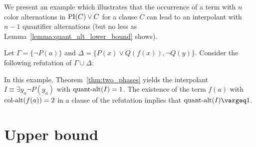 \documentclass[%
	draft=false,%
	numbers=noendperiod,%
	11pt,%
	a4paper,%
	oneside,%
	openany,%
]{memoir}
\begin{document}
\begin{comment}
\begin{lemma}
	\label{lemma:quant_alt_lower_bound_old}
	If a term with $n$ color alternations occurs in $\PI^*(C) \lor C$ for a clause $C$, then the interpolant $I$ produced in Theorem~\ref{thm:two_phases} contains at least $n-1$ quantifier alternations.
\end{lemma}
\begin{proof}
	By Lemma~\ref{lemma:subterm_in_gray_lit}, a term with $n-1$ color alternations occurs in a gray literal or an equality in $\PI(C) \lor C$.
	Lemma~\ref{lemma:col_alt_in_gray_lit_then_quant_alt} gives the result.
\end{proof}
\end{comment}


We present an example which illustrates that the occurrence of a term with $n$ color alternations in $\PI(C) \lor C$ for a clause $C$ can lead to an interpolant with $n-1$ quantifier alternations (but no less as Lemma~\ref{lemma:quant_alt_lower_bound} shows).
\begin{exa}
	Let $\Gamma = \{ \lnot P(a) \}$ and $\Delta = \{ P(x) \lor Q(f(x)), \lnot Q(y) \}$.
	Consider the following refutation of $\Gamma \cup \Delta$:
	\begin{prooftree}


	\end{prooftree}

	In this example, Theorem~\ref{thm:two_phases} yields the interpolant $I \equiv \exists y_a \lnot P(y_a)$ with $\qa(I) =\nolinebreak 1$.
	The existence of the term $f(a)$ with $\ca(f(a)) = 2$ in a clause of the refutation implies that $\qa(I) \vargeq 1$.
\end{exa}

\section{Upper bound}
\end{document}
